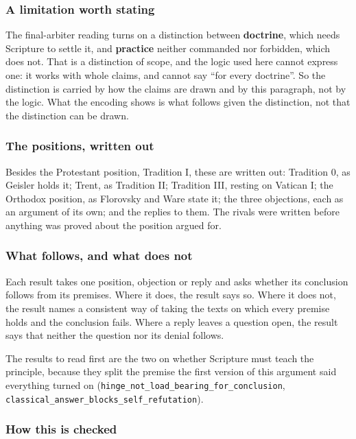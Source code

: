 \documentclass[11pt]{article}
\begin{document}
\subsubsection*{A limitation worth stating}
The final-arbiter reading turns on a distinction between \textbf{doctrine}, which needs Scripture to settle it, and \textbf{practice} neither commanded nor forbidden, which does not. That is a distinction of scope, and the logic used here cannot express one: it works with whole claims, and cannot say “for every doctrine”. So the distinction is carried by how the claims are drawn and by this paragraph, not by the logic. What the encoding shows is what follows given the distinction, not that the distinction can be drawn.

\subsubsection*{The positions, written out}
Besides the Protestant position, Tradition I, these are written out: Tradition 0, as Geisler holds it; Trent, as Tradition II; Tradition III, resting on Vatican I; the Orthodox position, as Florovsky and Ware state it; the three objections, each as an argument of its own; and the replies to them. The rivals were written before anything was proved about the position argued for.

\subsubsection*{What follows, and what does not}
Each result takes one position, objection or reply and asks whether its conclusion follows from its premises. Where it does, the result says so. Where it does not, the result names a consistent way of taking the texts on which every premise holds and the conclusion fails. Where a reply leaves a question open, the result says that neither the question nor its denial follows.

The results to read first are the two on whether Scripture must teach the principle, because they split the premise the first version of this argument said everything turned on (\texttt{hinge\_\allowbreak{}not\_\allowbreak{}load\_\allowbreak{}bearing\_\allowbreak{}for\_\allowbreak{}conclusion}, \texttt{classical\_\allowbreak{}answer\_\allowbreak{}blocks\_\allowbreak{}self\_\allowbreak{}refutation}).

\subsubsection*{How this is checked}
\end{document}
